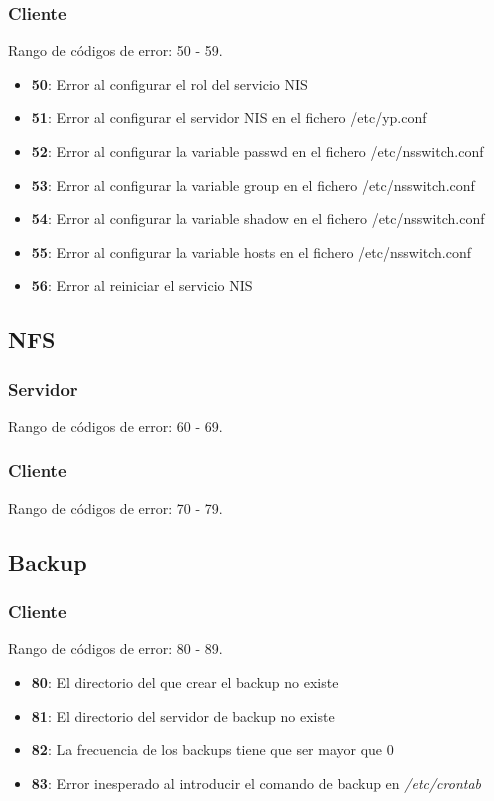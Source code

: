 \documentclass[12pt,a4paper, spanish]{article}
\begin{document}
\subsubsection{Cliente}
Rango de códigos de error: 50 - 59.
\begin{itemize}
\item \textbf{50}: Error al configurar el rol del servicio NIS
\item \textbf{51}: Error al configurar el servidor NIS en el fichero /etc/yp.conf
\item \textbf{52}: Error al configurar la variable passwd en el fichero /etc/nsswitch.conf
\item \textbf{53}: Error al configurar la variable group en el fichero /etc/nsswitch.conf
\item \textbf{54}: Error al configurar la variable shadow en el fichero /etc/nsswitch.conf
\item \textbf{55}: Error al configurar la variable hosts en el fichero /etc/nsswitch.conf
\item \textbf{56}: Error al reiniciar el servicio NIS
\end{itemize}

\subsection{NFS}

\subsubsection{Servidor}
Rango de códigos de error: 60 - 69.

\subsubsection{Cliente}
Rango de códigos de error: 70 - 79.

\subsection{Backup}

\subsubsection{Cliente}
Rango de códigos de error: 80 - 89.
\begin{itemize}
\item \textbf{80}: El directorio del que crear el backup no existe
\item \textbf{81}: El directorio del servidor de backup no existe
\item \textbf{82}: La frecuencia de los backups tiene que ser mayor que 0
\item \textbf{83}: Error inesperado al introducir el comando de backup en \textit{/etc/crontab}
\end{itemize}
\end{document}

